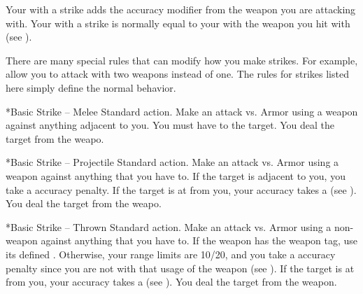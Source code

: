         Your  with a strike adds the accuracy modifier from the weapon you are attacking with.
        Your  with a strike is normally equal to your  with the weapon you hit with (see ).

        There are many special rules that can modify how you make strikes.
        For example,  allow you to attack with two weapons instead of one.
        The rules for strikes listed here simply define the normal behavior.

        \begin{activeability}*{Basic Strike -- Melee}
            \abilityusagetime Standard action.
            \rankline
            Make an attack vs. Armor using a weapon against anything adjacent to you.
            You must have  to the target.
            \hit You deal the target  from the weapo.
        \end{activeability}

        \begin{activeability}*{Basic Strike -- Projectile}
            \abilityusagetime Standard action.
            \rankline
            Make an attack vs. Armor using a  weapon against anything that you have  to.
            If the target is adjacent to you, you take a  accuracy penalty.
            If the target is at  from you, your accuracy takes a   (see ).
            \hit You deal the target  from the weapo.
        \end{activeability}

        \begin{activeability}*{Basic Strike -- Thrown}
            \abilityusagetime Standard action.
            \rankline
            Make an attack vs. Armor using a non- weapon against anything that you have  to.
            If the weapon has the  weapon tag, use its defined .
            Otherwise, your range limits are 10/20, and you take a  accuracy penalty since you are not  with that usage of the weapon (see ).
            If the target is at  from you, your accuracy takes a   (see ).
            \hit You deal the target  from the weapon.
        \end{activeability}

